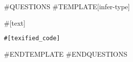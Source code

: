 \documentclass[a4paper]{article}
\newenvironment{exercise}{
  \begin{framed}}{
  \end{framed}}
\begin{document}
#QUESTIONS
#TEMPLATE[infer-type]
\begin{exercise}
\noindent #[text]
\begin{lstlisting}[language=MyJava]
#[texified_code]
\end{lstlisting}
\end{exercise}
\clearpage
#ENDTEMPLATE
#ENDQUESTIONS
\end{document}
